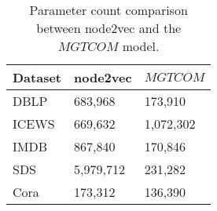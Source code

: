 \begin{table}[ht!]
\centering
\caption{
    Parameter count comparison between node2vec and the $MGTCOM$ model.
    \label{tab:params}
}
\small
\begin{tabular}{l|ll}
    \hline
    Dataset & node2vec  & $MGTCOM$  \\ \hline
    DBLP    & 683,968   & 173,910   \\
    ICEWS   & 669,632   & 1,072,302 \\
    IMDB    & 867,840   & 170,846   \\
    SDS     & 5,979,712 & 231,282   \\
    Cora    & 173,312   & 136,390   \\ \hline
\end{tabular}
\end{table}